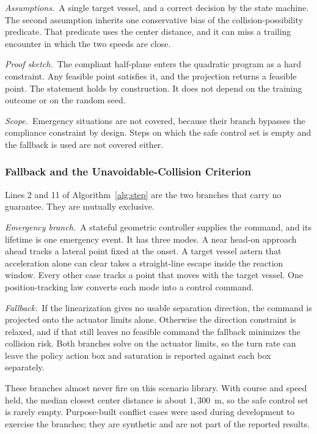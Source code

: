 \documentclass[10pt,letterpaper]{article}
\begin{document}
\noindent\textit{Assumptions.}\ A single target vessel, and a correct decision by the state
machine. The second assumption inherits one conservative bias of the collision-possibility
predicate. That predicate uses the center distance, and it can miss a trailing encounter in
which the two speeds are close.

\noindent\textit{Proof sketch.}\ The compliant half-plane enters the quadratic program as a
hard constraint. Any feasible point satisfies it, and the projection returns a feasible
point. The statement holds by construction. It does not depend on the training outcome or
on the random seed.

\noindent\textit{Scope.}\ Emergency situations are not covered, because their branch
bypasses the compliance constraint by design. Steps on which the safe control set is empty
and the fallback is used are not covered either.

\subsubsection{Fallback and the Unavoidable-Collision Criterion}
\label{sec:fallback}

Lines 2 and 11 of Algorithm~\ref{alg:step} are the two branches that carry no guarantee.
They are mutually exclusive.

\noindent\textit{Emergency branch.}\ A stateful geometric controller supplies the
command, and its lifetime is one emergency event. It has three modes. A near head-on approach ahead tracks a lateral point fixed at the
onset. A target vessel astern that acceleration alone can clear takes a straight-line
escape inside the reaction window. Every other case tracks a point that moves with the
target vessel. One position-tracking
law converts each mode into a control command.

\noindent\textit{Fallback.}\ If the linearization gives no usable separation direction,
the command is projected onto the actuator limits alone. Otherwise the direction
constraint is relaxed, and if that still leaves no feasible command the fallback
minimizes the collision risk. Both branches solve on the actuator limits, so the turn
rate can leave the policy action box and saturation is reported against each box
separately.

These branches almost never fire on this scenario library. With course and speed held,
the median closest center distance is about $1{,}300$~m, so the safe control set is
rarely empty. Purpose-built conflict cases were used during development to exercise the
branches; they are synthetic and are not part of the reported results.
\end{document}

